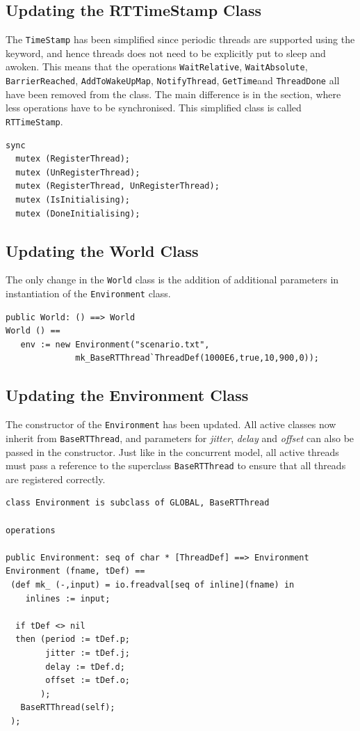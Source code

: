 \documentclass{overturerepchap}
\begin{document}
\subsection{Updating the RTTimeStamp Class}

The \texttt{TimeStamp} has been simplified since periodic threads are supported using the {\bf{}} keyword, and hence threads does not need to be explicitly put to sleep and awoken. This means that the operations \texttt{WaitRelative}, \texttt{WaitAbsolute}, \texttt{BarrierReached}, \texttt{AddToWakeUpMap}, \texttt{NotifyThread}, \texttt{GetTime}and \texttt{ThreadDone} all have been removed from the class. The main difference is in the {\bf{}} section, where less operations have to be synchronised. This simplified class is called \texttt{RTTimeStamp}.

\begin{lstlisting}
sync 
  mutex (RegisterThread);
  mutex (UnRegisterThread); 
  mutex (RegisterThread, UnRegisterThread);
  mutex (IsInitialising);
  mutex (DoneInitialising);
\end{lstlisting}


\subsection{Updating the World Class}

The only change in the \texttt{World} class is the addition of additional parameters in instantiation of the \texttt{Environment} class.

\begin{lstlisting}
public World: () ==> World
World () ==
   env := new Environment("scenario.txt", 
              mk_BaseRTThread`ThreadDef(1000E6,true,10,900,0));
\end{lstlisting}

\subsection{Updating the Environment Class}

The constructor of the \texttt{Environment} has been updated. All active classes now inherit from \texttt{BaseRTThread}, and parameters for \emph{jitter}, \emph{delay} and \emph{offset} can also be passed in the constructor. Just like in the concurrent model, all active threads must pass a reference to the superclass \texttt{BaseRTThread} to ensure that all threads are registered correctly.

\begin{lstlisting}
class Environment is subclass of GLOBAL, BaseRTThread

operations

public Environment: seq of char * [ThreadDef] ==> Environment
Environment (fname, tDef) ==
 (def mk_ (-,input) = io.freadval[seq of inline](fname) in
    inlines := input;
   
  if tDef <> nil
  then (period := tDef.p;
        jitter := tDef.j;
        delay := tDef.d;
        offset := tDef.o;
       ); 
   BaseRTThread(self);
 );
\end{lstlisting}
\end{document}
